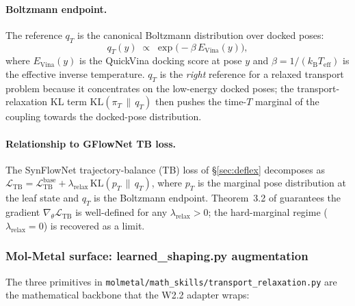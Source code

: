 \paragraph{Boltzmann endpoint.}
The reference $q_{T}$ is the canonical Boltzmann distribution over
docked poses:
\begin{equation}
  \label{eq:boltzmann-endpoint}
  q_{T}(y) \;\propto\; \exp\!\bigl(- \beta\, E_{\mathrm{Vina}}(y)\bigr),
\end{equation}
where $E_{\mathrm{Vina}}(y)$ is the QuickVina docking score at pose
$y$ and $\beta = 1/(k_{\mathrm{B}} T_{\mathrm{eff}})$ is the effective
inverse temperature.  $q_{T}$ is the \emph{right} reference for a
relaxed transport problem because it concentrates on the
low-energy docked poses; the transport-relaxation KL term
$\mathrm{KL}(\pi_{T} \,\|\, q_{T})$ then pushes the time-$T$
marginal of the coupling towards the docked-pose distribution.

\paragraph{Relationship to GFlowNet TB loss.}
The SynFlowNet trajectory-balance (TB) loss of
\S\ref{sec:deflex} decomposes as
$\mathcal{L}_{\mathrm{TB}} = \mathcal{L}_{\mathrm{TB}}^{\mathrm{base}}
+ \lambda_{\mathrm{relax}}\, \mathrm{KL}(p_{T} \,\|\, q_{T})$, where
$p_{T}$ is the marginal pose distribution at the leaf state and
$q_{T}$ is the Boltzmann endpoint.  Theorem~3.2 of
\cite{jiang2026sb_relax} guarantees the gradient
$\nabla_{\theta} \mathcal{L}_{\mathrm{TB}}$ is well-defined for any
$\lambda_{\mathrm{relax}} > 0$; the hard-marginal regime
($\lambda_{\mathrm{relax}} = 0$) is recovered as a limit.

\subsubsection{Mol-Metal surface: learned\_shaping.py augmentation}
\label{sec:method:transport-relaxation-surface}

The three primitives in
\texttt{molmetal/math\_skills/transport\_relaxation.py} are the
mathematical backbone that the W2.2 adapter wraps:

